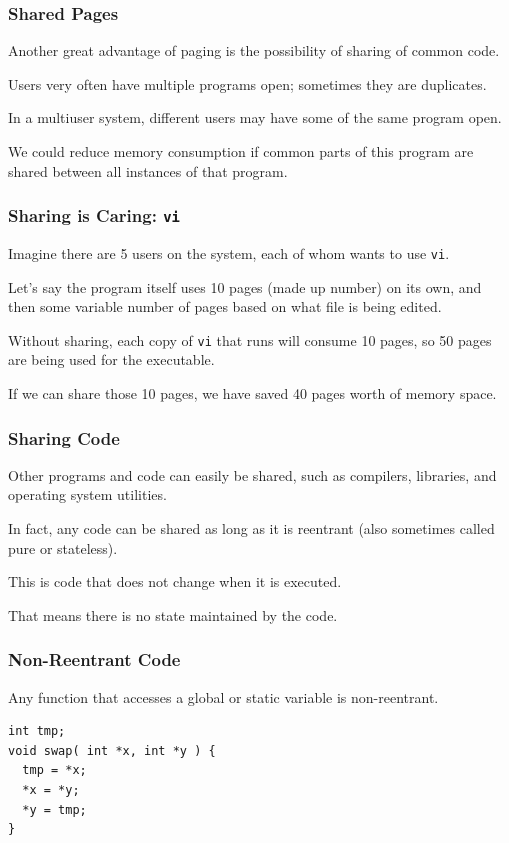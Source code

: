 \begin{frame}
\frametitle{Shared Pages}

Another great advantage of paging is the possibility of sharing of common code. 

Users very often have multiple programs open; sometimes they are duplicates.

In a multiuser system, different users may have some of the same program open.

We could reduce memory consumption if common parts of this program are shared between all instances of that program.

\end{frame}


\begin{frame}
\frametitle{Sharing is Caring: \texttt{vi}}

Imagine there are 5 users on the system, each of whom wants to use \texttt{vi}. 

Let's say the program itself uses 10 pages (made up number) on its own, and then some variable number of pages based on what file is being edited. 

Without sharing, each copy of \texttt{vi} that runs will consume 10 pages, so 50 pages are being used for the executable. 

If we can share those 10 pages, we have saved 40 pages worth of memory space.


\end{frame}

\begin{frame}
\frametitle{Sharing Code}

Other programs and code can easily be shared, such as compilers, libraries, and operating system utilities. 

In fact, any code can be shared as long as it is \alert{reentrant} (also sometimes called pure or stateless). 

This is code that does not change when it is executed. 

That means there is no state maintained by the code. 


\end{frame}

\begin{frame}[fragile]
\frametitle{Non-Reentrant Code}

Any function that accesses a global or static variable is non-reentrant.

\begin{verbatim}
int tmp;
void swap( int *x, int *y ) {
  tmp = *x;
  *x = *y;
  *y = tmp; 
}
\end{verbatim}

\end{frame}

